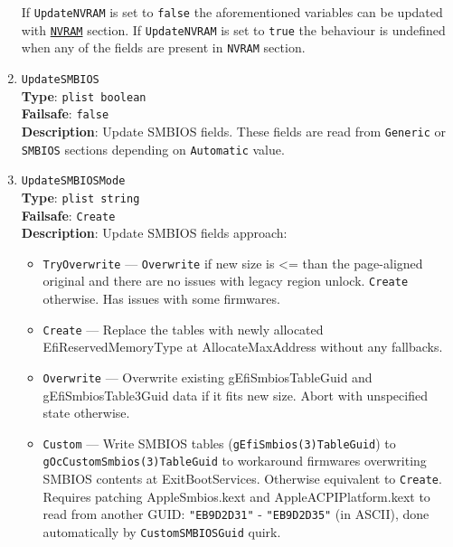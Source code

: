\documentclass[]{article}
\providecommand{\tightlist}{%
  \setlength{\itemsep}{0pt}\setlength{\parskip}{0pt}}
\begin{document}
\begin{enumerate}
  If \texttt{UpdateNVRAM} is set to \texttt{false} the aforementioned
  variables can be updated with \hyperref[nvram]{\texttt{NVRAM}}
  section. If \texttt{UpdateNVRAM} is set to \texttt{true} the behaviour is
  undefined when any of the fields are present in \texttt{NVRAM} section.
\item
  \texttt{UpdateSMBIOS}\\
  \textbf{Type}: \texttt{plist\ boolean}\\
  \textbf{Failsafe}: \texttt{false}\\
  \textbf{Description}: Update SMBIOS fields. These fields are read from
  \texttt{Generic} or \texttt{SMBIOS} sections depending on
  \texttt{Automatic} value.
\item
  \texttt{UpdateSMBIOSMode}\\
  \textbf{Type}: \texttt{plist\ string}\\
  \textbf{Failsafe}: \texttt{Create}\\
  \textbf{Description}: Update SMBIOS fields approach:

  \begin{itemize}
  \tightlist
  \item
    \texttt{TryOverwrite} --- \texttt{Overwrite} if new size is \textless{}= than
    the page-aligned original and there are no issues with legacy region
    unlock. \texttt{Create} otherwise. Has issues with some firmwares.
  \item
    \texttt{Create} --- Replace the tables with newly allocated
    EfiReservedMemoryType at AllocateMaxAddress without any fallbacks.
  \item
    \texttt{Overwrite} --- Overwrite existing gEfiSmbiosTableGuid and
    gEfiSmbiosTable3Guid data if it fits new size. Abort with
    unspecified state otherwise.
  \item
    \texttt{Custom} --- Write SMBIOS tables
    (\texttt{gEfiSmbios(3)TableGuid}) to \texttt{gOcCustomSmbios(3)TableGuid}
    to workaround firmwares overwriting SMBIOS contents at
    ExitBootServices. Otherwise equivalent to \texttt{Create}. Requires
    patching AppleSmbios.kext and AppleACPIPlatform.kext to read from
    another GUID: \texttt{"EB9D2D31"} - \texttt{"EB9D2D35"} (in ASCII),
    done automatically by \texttt{CustomSMBIOSGuid} quirk.
  \end{itemize}


\end{enumerate}
\end{document}
